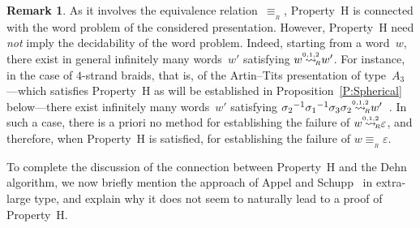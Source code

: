 \documentclass{amsart}
\numberwithin{equation}{section}
\theoremstyle{plain}
\theoremstyle{definition}
\newtheorem{rema}[prop]{Remark}
\begin{document}
\begin{rema}
As it involves the equivalence relation~${\equiv_{{\!{}_{R}}}}$, Property~${\mathrm{H}}$ is connected with the word problem of the considered presentation. However, Property~${\mathrm{H}}$ need \emph{not} imply the decidability of the word problem. Indeed, starting from a word~${w}$, there exist in general infinitely many words~${w}'$ satisfying ${w} {\mathrel{{\mathrel{\overset{\scriptscriptstyle 0,1,2}{\rightsquigarrow}}}_{\hspace{-0.9ex}{\scriptscriptstyle R}}}} {w}'$. For instance, in the case of $4$-strand braids, that is, of the Artin--Tits presentation of type~$A_3$---which satisfies Property~${\mathrm{H}}$ as will be established in Proposition~\ref{P:Spherical} below---there exist infinitely many words~${w}'$ satisfying $\sigma_2{^{-1}} \sigma_1{^{-1}} \sigma_3 \sigma_2 {\mathrel{{\mathrel{\overset{\scriptscriptstyle 0,1,2}{\rightsquigarrow}}}_{\hspace{-0.9ex}{\scriptscriptstyle R}}}} {w}'$~\cite{Dhg}. In such a case, there is a priori no method for establishing the failure of ${w} {\mathrel{{\mathrel{\overset{\scriptscriptstyle 0,1,2}{\rightsquigarrow}}}_{\hspace{-0.9ex}{\scriptscriptstyle R}}}} {\varepsilon}$, and therefore, when Property~${\mathrm{H}}$ is satisfied, for establishing the failure of ${w} {\equiv_{{\!{}_{R}}}} {\varepsilon}$.  
\end{rema}

To complete the discussion of the connection between Property~${\mathrm{H}}$ and the Dehn algorithm, we now briefly mention the approach of Appel and Schupp~\cite{ApS} in  extra-large type, and explain why it does not seem to naturally lead to a proof of Property~${\mathrm{H}}$.
\end{document}
